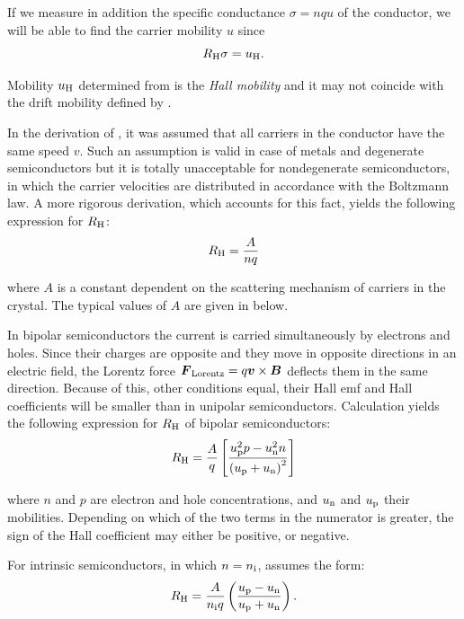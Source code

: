 If we measure in addition the specific conductance $\sigma=nqu$ of the conductor, we will be able to find the carrier mobility $u$ since
\begin{equation}\label{eq:9_36}
    R_{\text{H}} \sigma = u_{\text{H}}.
\end{equation}

Mobility $u_{\text{H}}$ determined from  is the \textit{Hall mobility} and it may not coincide with the drift mobility defined by .

In the derivation of , it was assumed that all carriers in the conductor have the same speed $v$. Such an assumption is valid in case of metals and degenerate semiconductors but it is totally unacceptable for nondegenerate semiconductors, in which the carrier velocities are distributed in accordance with the Boltzmann law. A more rigorous derivation, which accounts for this fact, yields the following expression for $R_{\text{H}}$:
\begin{equation}\label{eq:9_37}
    R_{\text{H}} = \frac{A}{nq}
\end{equation}

\noindent
where $A$ is a constant dependent on the scattering mechanism of carriers in the crystal. The typical values of $A$ are given in  below.

In bipolar semiconductors the current is carried simultaneously by electrons and holes. Since their charges are opposite and they move in opposite directions in an electric field, the Lorentz force $\boldsymbol{F}_{\text{Lorentz}}=q\boldsymbol{v}\times\boldsymbol{B}$ deflects them in the same direction. Because of this, other conditions equal, their Hall emf and Hall coefficients will be smaller than in unipolar semiconductors. Calculation yields the following expression for $R_{\text{H}}$ of bipolar semiconductors:
\begin{equation}\label{eq:9_38}
    R_{\text{H}} = \frac{A}{q} \left[\frac{u_{\text{p}}^2 p - u_{\text{n}}^2 n}{\left(u_{\text{p}} + u_{\text{n}}\right)^2}\right]
\end{equation}

\noindent
where $n$ and $p$ are electron and hole concentrations, and $u_{\text{n}}$ and $u_{\text{p}}$ their mobilities. Depending on which of the two terms in the numerator is greater, the sign of the Hall coefficient may either be positive, or negative.

For intrinsic semiconductors, in which $n=n_{\text{i}}$,  assumes the form:
\begin{equation}\label{eq:9_39}
    R_{\text{H}} = \frac{A}{n_{\text{i}}q} \left(\frac{u_{\text{p}} - u_{\text{n}}}{u_{\text{p}} + u_{\text{n}}}\right).
\end{equation}


